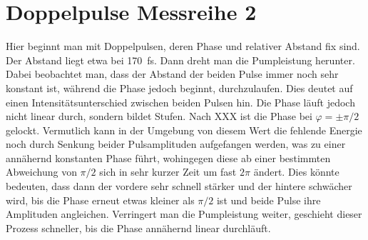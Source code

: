 \documentclass[bachelor,       %
               twoside,        %
               BCOR10mm,       %
               english,ngerman, %
               ]{GAUBM}
\begin{document}
\section{Doppelpulse Messreihe 2}
Hier beginnt man mit Doppelpulsen, deren Phase und relativer Abstand fix sind.
Der Abstand liegt etwa bei 170 \,fs.
Dann dreht man die Pumpleistung herunter.
Dabei beobachtet man, dass der Abstand der beiden Pulse immer noch sehr konstant ist, während die Phase jedoch beginnt, durchzulaufen.
Dies deutet auf einen Intensitätsunterschied zwischen beiden Pulsen hin.
Die Phase läuft jedoch nicht linear durch, sondern bildet Stufen.
Nach XXX ist die Phase bei $\varphi=\pm\pi/2$ gelockt.
Vermutlich kann in der Umgebung von diesem Wert die fehlende Energie noch durch Senkung beider Pulsamplituden aufgefangen werden, was zu einer annähernd konstanten Phase führt, wohingegen diese ab einer bestimmten Abweichung von $\pi/2$ sich in sehr kurzer Zeit um fast $2\pi$ ändert.
Dies könnte bedeuten, dass dann der vordere sehr schnell stärker und der hintere schwächer wird, bis die Phase erneut etwas kleiner als $\pi/2$ ist und beide Pulse ihre Amplituden angleichen.
Verringert man die Pumpleistung weiter, geschieht dieser Prozess schneller, bis die Phase annähernd linear durchläuft.
\end{document}
